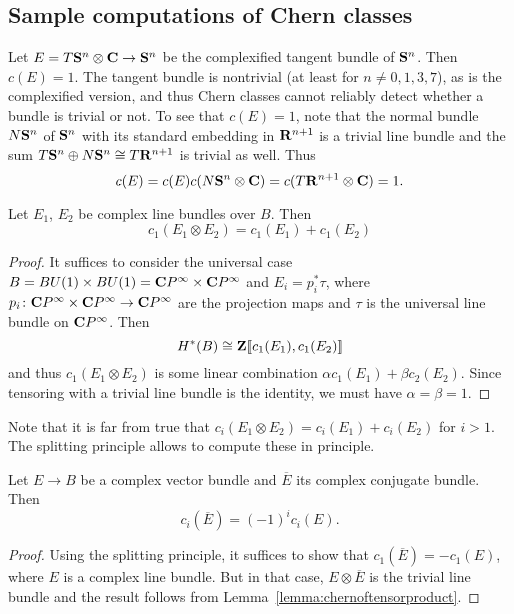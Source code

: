 \documentclass[a4paper,openany]{scrbook}
\begin{document}
\subsection{Sample computations of Chern classes}\label{subsec:computationschern}

\begin{example}
Let $E=T\S^n \otimes \CC \to \S^n$ be the complexified tangent bundle of $\S^n$. Then $c(E)=1$. The tangent bundle is nontrivial (at least for $n \neq 0,1,3,7$), as is the complexified version, and thus Chern classes cannot reliably detect whether a bundle is trivial or not. To see that $c(E)=1$, note that the normal bundle $N\S^n$ of $\S^n$ with its standard embedding in $\R^{n+1}$ is a trivial line bundle and the sum $T\S^n \oplus N\S^n \cong T\R^{n+1}$ is trivial as well. Thus
\[
c(E) = c(E)c(N\S^n \otimes \CC) = c(T\R^{n+1}\otimes \CC) = 1.
\]
\end{example}

\begin{lemma}\label{lemma:chernoftensorproduct}
Let $E_1$, $E_2$ be complex line bundles over $B$. Then
\[
c_1(E_1 \otimes E_2) = c_1(E_1) + c_1(E_2)
\]
\end{lemma}
\begin{proof}
It suffices to consider the universal case $B=BU(1)\times BU(1) = \CP^\infty \times \CP^\infty$ and $E_i = p_i^*\tau$, where $p_i\colon \CP^\infty \times \CP^\infty \to \CP^\infty$ are the projection maps and $\tau$ is the universal line bundle on $\CP^\infty$. Then
\[
H^*(B) \cong \Z\pow{c_1(E_1),c_1(E_2)}
\]
and thus $c_1(E_1 \otimes E_2)$ is some linear combination $\alpha c_1(E_1) + \beta c_2(E_2)$. Since tensoring with a trivial line bundle is the identity, we must have $\alpha=\beta=1$. 
\end{proof}

Note that it is far from true that $c_i(E_1 \otimes E_2) = c_i(E_1) + c_i(E_2)$ for $i>1$. The splitting principle allows to compute these in principle.

\begin{lemma}
Let $E \to B$ be a complex vector bundle and $\overline E$ its complex conjugate bundle. Then
\[
c_i(\overline E) = (-1)^i c_i(E).
\]
\end{lemma}
\begin{proof}
Using the splitting principle, it suffices to show that $c_1(\overline E) = -c_1(E)$, where $E$ is a complex line bundle. But in that case, $E \otimes \overline E$ is the trivial line bundle and the result follows from Lemma~\ref{lemma:chernoftensorproduct}.
\end{proof}
\end{document}
